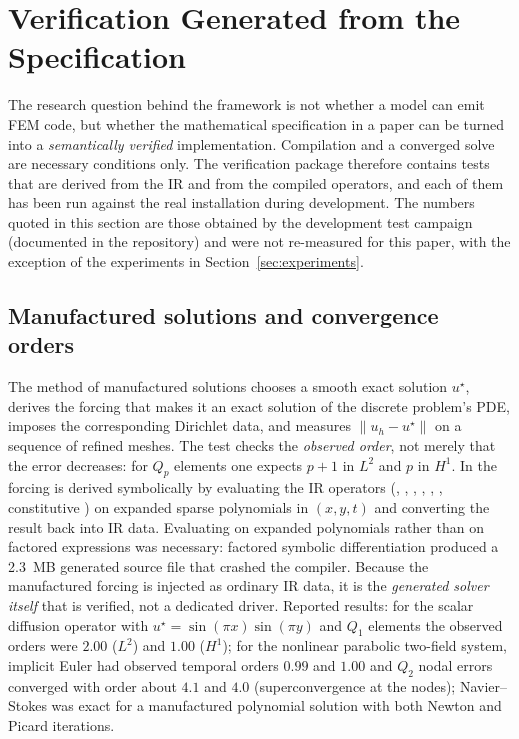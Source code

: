 \section{Verification Generated from the Specification}
\label{sec:verification}

The research question behind the framework is not whether a model can emit FEM code, but whether the mathematical specification in a paper can be turned into a \emph{semantically verified} implementation. Compilation and a converged solve are necessary conditions only. The verification package therefore contains tests that are derived from the IR and from the compiled operators, and each of them has been run against the real \dealii{} installation during development. The numbers quoted in this section are those obtained by the development test campaign (documented in the repository) and were not re-measured for this paper, with the exception of the experiments in Section~\ref{sec:experiments}.

\subsection{Manufactured solutions and convergence orders}
The method of manufactured solutions \citep{roache1998,salari2000} chooses a smooth exact solution $u^\star$, derives the forcing that makes it an exact solution of the discrete problem's PDE, imposes the corresponding Dirichlet data, and measures $\|u_h-u^\star\|$ on a sequence of refined meshes. The test checks the \emph{observed order}, not merely that the error decreases: for $Q_p$ elements one expects $p+1$ in $L^2$ and $p$ in $H^1$. In \femagent{} the forcing is derived symbolically by evaluating the IR operators (, , , , , , constitutive ) on expanded sparse polynomials in $(x,y,t)$ and converting the result back into IR data. Evaluating on expanded polynomials rather than on factored expressions was necessary: factored symbolic differentiation produced a 2.3~MB generated source file that crashed the compiler. Because the manufactured forcing is injected as ordinary IR data, it is the \emph{generated solver itself} that is verified, not a dedicated driver. Reported results: for the scalar diffusion operator with $u^\star=\sin(\pi x)\sin(\pi y)$ and $Q_1$ elements the observed orders were $2.00$ ($L^2$) and $1.00$ ($H^1$); for the nonlinear parabolic two-field system, implicit Euler had observed temporal orders $0.99$ and $1.00$ and $Q_2$ nodal errors converged with order about $4.1$ and $4.0$ (superconvergence at the nodes); Navier--Stokes was exact for a manufactured polynomial solution with both Newton and Picard iterations.

